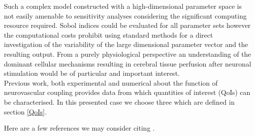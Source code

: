 Such a complex model constructed with a high-dimensional parameter space is not easily amenable to sensitivity analyses considering the significant computing resource required. Sobol indices could be evaluated for all parameter sets however the computational costs prohibit using standard methods for a direct investigation of the variability of the large dimensional parameter vector and the resulting output.
From a purely physiological perspective an understanding of the dominant cellular mechanisms resulting in cerebral tissue perfusion after neuronal stimulation would be of particular and important interest.\\
Previous work, both experimental and numerical about the function of neurovascular coupling provides data from which quantities of interest (QoIs) can be characterised. In this presented case we choose three which are defined in section \ref{QoIs}. 

  
  
Here are a few references we may consider citing  \cite{gsa_pharm,lr_gsa,uqpy,Witthoft2013}.

